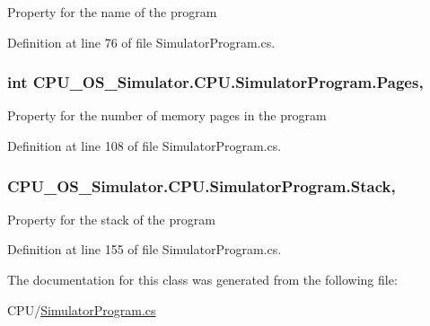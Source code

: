 Property for the name of the program 



Definition at line 76 of file Simulator\+Program.\+cs.

\hypertarget{class_c_p_u___o_s___simulator_1_1_c_p_u_1_1_simulator_program_aa33b4428956a097dd710948ee51bb5f3}{}
\subsubsection[{Pages}]{\setlength{\rightskip}{0pt plus 5cm}int C\+P\+U\+\_\+\+O\+S\+\_\+\+Simulator.\+C\+P\+U.\+Simulator\+Program.\+Pages\hspace{0.3cm}{\ttfamily [get]}, {\ttfamily [set]}}\label{class_c_p_u___o_s___simulator_1_1_c_p_u_1_1_simulator_program_aa33b4428956a097dd710948ee51bb5f3}


Property for the number of memory pages in the program 



Definition at line 108 of file Simulator\+Program.\+cs.

\hypertarget{class_c_p_u___o_s___simulator_1_1_c_p_u_1_1_simulator_program_ac6065e57e8d108a0aefd27840f3bf01c}{}
\subsubsection[{Stack}]{ C\+P\+U\+\_\+\+O\+S\+\_\+\+Simulator.\+C\+P\+U.\+Simulator\+Program.\+Stack\hspace{0.3cm}{\ttfamily [get]}, {\ttfamily [set]}}\label{class_c_p_u___o_s___simulator_1_1_c_p_u_1_1_simulator_program_ac6065e57e8d108a0aefd27840f3bf01c}


Property for the stack of the program 



Definition at line 155 of file Simulator\+Program.\+cs.



The documentation for this class was generated from the following file\+:\begin{DoxyCompactItemize}
\item 
C\+P\+U/\hyperlink{_simulator_program_8cs}{Simulator\+Program.\+cs}\end{DoxyCompactItemize}
